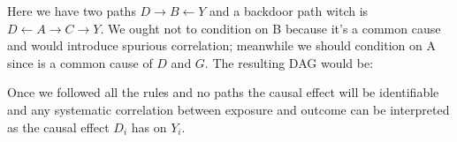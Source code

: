 \begin{figure}[H]
\centering
\end{figure} 
Here we have two paths $D \rightarrow B \leftarrow Y $ and a backdoor path witch is $D \leftarrow A \rightarrow C  \rightarrow Y$. We ought not to condition on B because it's a common cause and would introduce spurious correlation; meanwhile we should condition on A since is a common cause of $D$ and $G$. The resulting DAG would be:
\begin{figure}[H]
\centering
\end{figure} 
Once we followed all the rules and no paths the causal effect will be identifiable and any systematic correlation between exposure and outcome can be interpreted as the causal effect $D_i$ has on $Y_i$.

%
%
%
